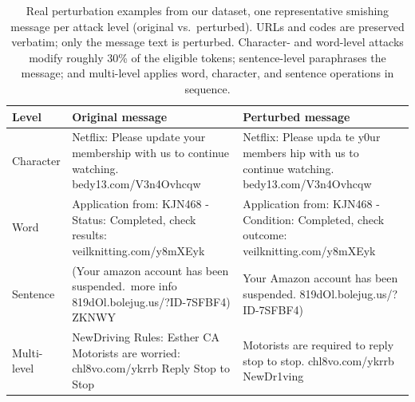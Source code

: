 
\begin{table}[t]
\centering
\caption{Real perturbation examples from our dataset, one representative smishing
message per attack level (original vs.\ perturbed). URLs and codes are preserved
verbatim; only the message text is perturbed. Character- and word-level attacks
modify roughly 30\% of the eligible tokens; sentence-level paraphrases the message;
and multi-level applies word, character, and sentence operations in sequence.}
\label{tab:perturbation-examples}
\footnotesize
\begin{tabular}{@{}l p{} p{}@{}}
\toprule
\textbf{Level} & \textbf{Original message} & \textbf{Perturbed message} \\
\midrule
Character &
Netflix: Please update your membership with us to continue watching. bedy13.com/V3n4Ovhcqw &
Netflix: Please upda te y0ur members hip with us to continue watching. bedy13.com/V3n4Ovhcqw \\
\addlinespace
Word &
Application from: KJN468 - Status: Completed, check results: veilknitting.com/y8mXEyk &
Application from: KJN468 - Condition: Completed, check outcome: veilknitting.com/y8mXEyk \\
\addlinespace
Sentence &
(Your amazon account has been suspended.\ more info 819dOl.bolejug.us/?ID-7SFBF4) ZKNWY &
Your Amazon account has been suspended. 819dOl.bolejug.us/?ID-7SFBF4) \\
\addlinespace
Multi-level &
NewDriving Rules: Esther CA Motorists are worried: chl8vo.com/ykrrb Reply Stop to Stop &
Motorists are required to reply stop to stop. chl8vo.com/ykrrb NewDr1ving \\
\bottomrule
\end{tabular}
\end{table}
